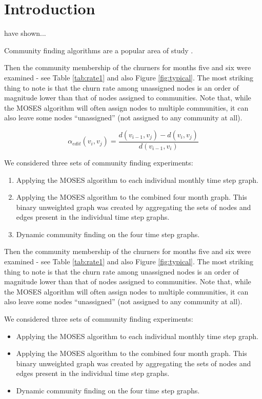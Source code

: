 
\section{Introduction}


\citet{klink06biblio} have shown...

Community finding algorithms are a popular area of study \citep{palla05nature,fortunato10review}.

Then the community membership of the churners for months five and six were examined - see Table \ref{tab:rate1} and also Figure \ref{fig:typical}. The most striking thing to note is that the churn rate among unassigned nodes is an order of magnitude lower than that of nodes assigned to communities. 
Note that, while the MOSES algorithm will often assign nodes to multiple communities, it can also leave some nodes ``unassigned'' (\ie not assigned to any community at all).

\begin{equation}
\label{formula:EditQuality}
   \alpha_{edit}(v_{i},v_{j})= \frac{d(v_{i-1},v_{j})-d(v_{i},v_{j})}{d(v_{i-1},v_{i})} %
\end{equation}

We considered three sets of community finding experiments:
\begin{enumerate}
\item Applying the MOSES algorithm to each individual monthly time step graph.
\item Applying the MOSES algorithm to the combined four month graph. This binary unweighted graph was created by aggregating the sets of nodes and edges present in the individual time step graphs.
\item Dynamic community finding on the four time step graphs. 
\end{enumerate}

Then the community membership of the churners for months five and six were examined - see Table \ref{tab:rate1} and also Figure \ref{fig:typical}. The most striking thing to note is that the churn rate among unassigned nodes is an order of magnitude lower than that of nodes assigned to communities. 
Note that, while the MOSES algorithm will often assign nodes to multiple communities, it can also leave some nodes ``unassigned'' (\ie not assigned to any community at all).


We considered three sets of community finding experiments:
\begin{itemize}
\item Applying the MOSES algorithm to each individual monthly time step graph.
\item Applying the MOSES algorithm to the combined four month graph. This binary unweighted graph was created by aggregating the sets of nodes and edges present in the individual time step graphs.
\item Dynamic community finding on the four time step graphs. 
\end{itemize}


